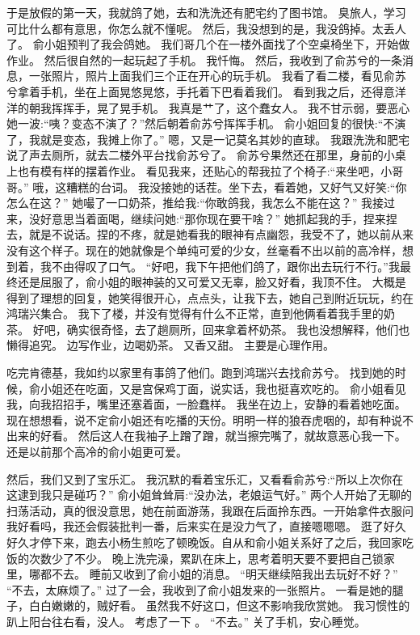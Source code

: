 于是放假的第一天，我就鸽了她，去和洗洗还有肥宅约了图书馆。
臭旅人，学习可比什么都有意思，你怎么就不懂呢。
然后，我没想到的是，我没鸽掉。太丢人了。
俞小姐预判了我会鸽她。
我们哥几个在一楼外面找了个空桌椅坐下，开始做作业。
然后很自然的一起玩起了手机。
我忏悔。
然后，我收到了俞苏兮的一条消息，一张照片，照片上面我们三个正在开心的玩手机。
我看了看二楼，看见俞苏兮拿着手机，坐在上面晃悠晃悠，手托着下巴看着我们。
看到我之后，还得意洋洋的朝我挥挥手，晃了晃手机。
我真是艹了，这个蠢女人。
我不甘示弱，要恶心她一波:“咦？变态不演了？”然后朝着俞苏兮挥挥手机。
俞小姐回复的很快:“不演了，我就是变态，我摊上你了。”
嗯，又是一记莫名其妙的直球。
我跟洗洗和肥宅说了声去厕所，就去二楼外平台找俞苏兮了。
俞苏兮果然还在那里，身前的小桌上也有模有样的摆着作业。
看见我来，还贴心的帮我拉了个椅子:“来坐吧，小哥哥。”
哦，这糟糕的台词。
我没接她的话茬。坐下去，看着她，又好气又好笑:“你怎么在这？”
她嘬了一口奶茶，推给我:“你敢鸽我，我怎么不能在这？”
我接过来，没好意思当着面喝，继续问她:“那你现在要干啥？”
她抓起我的手，捏来捏去，就是不说话。捏的不疼，就是她看我的眼神有点幽怨，我受不了，她以前从来没有这个样子。现在的她就像是个单纯可爱的少女，丝毫看不出以前的高冷样，想到着，我不由得叹了口气。
“好吧，我下午把他们鸽了，跟你出去玩行不行。”我最终还是屈服了，俞小姐的眼神装的又可爱又无辜，脸又好看，我顶不住。
大概是得到了理想的回复，她笑得很开心，点点头，让我下去，她自己到附近玩玩，约在鸿瑞兴集合。
我下了楼，并没有觉得有什么不正常，直到他俩看着我手里的奶茶。
好吧，确实很奇怪，去了趟厕所，回来拿着杯奶茶。
我也没想解释，他们也懒得追究。
边写作业，边喝奶茶。
又香又甜。
主要是心理作用。

吃完肯德基，我如约以家里有事鸽了他们。跑到鸿瑞兴去找俞苏兮。
找到她的时候，俞小姐还在吃面，又是宫保鸡丁面，说实话，我也挺喜欢吃的。 俞小姐看见我，向我招招手，嘴里还塞着面，一脸蠢样。
我坐在边上，安静的看着她吃面。现在想想看，说不定俞小姐还有吃播的天份。明明一样的狼吞虎咽的，却有种说不出来的好看。
然后这人在我袖子上蹭了蹭，就当擦完嘴了，就故意恶心我一下。
还是以前那个高冷的俞小姐更可爱。

然后，我们又到了宝乐汇。
我沉默的看着宝乐汇，又看看俞苏兮:“所以上次你在这逮到我只是碰巧？”
俞小姐耸耸肩:“没办法，老娘运气好。”
两个人开始了无聊的扫荡活动，真的很没意思，她在前面游荡，我跟在后面拎东西。一开始拿件衣服问我好看吗，我还会假装批判一番，后来实在是没力气了，直接嗯嗯嗯。 逛了好久好久才停下来，跑去小杨生煎吃了顿晚饭。自从和俞小姐关系好了之后，我回家吃饭的次数少了不少。
晚上洗完澡，累趴在床上，思考着明天要不要把自己锁家里，哪都不去。
睡前又收到了俞小姐的消息。
“明天继续陪我出去玩好不好？”
“不去，太麻烦了。”
过了一会，我收到了俞小姐发来的一张照片。
一看是她的腿子，白白嫩嫩的，贼好看。
虽然我不好这口，但这不影响我欣赏她。
我习惯性的趴上阳台往右看，没人。
考虑了一下 。
“不去。”
关了手机，安心睡觉。

